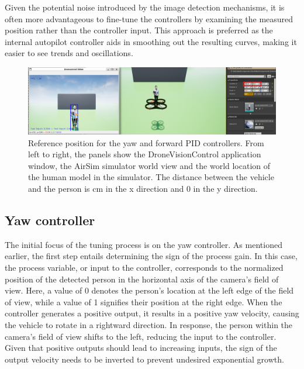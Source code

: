 Given the potential noise introduced by the image detection mechanisms, it is often more advantageous to fine-tune the controllers by examining the measured position rather than the controller input. This approach is preferred as the internal autopilot controller aids in smoothing out the resulting curves, making it easier to see trends and oscillations.



\begin{figure}[H]
  \centering
  \includegraphics[width=\textwidth, keepaspectratio]{img/pid-3/tune-ref-pos.png}
  \caption{Reference position for the yaw and forward PID controllers. From left to right, the panels show the DroneVisionControl application window, the AirSim simulator world view and the world location of the human model in the simulator. The distance between the vehicle and the person is \unit[420]{cm} in the x direction and 0 in the y direction.}
  \label{fig:tune-start-pos}
\end{figure}


\subsection{Yaw controller}

The initial focus of the tuning process is on the yaw controller. As mentioned earlier, the first step entails determining the sign of the process gain. In this case, the process variable, or input to the controller, corresponds to the normalized position of the detected person in the horizontal axis of the camera's field of view. Here, a value of 0 denotes the person's location at the left edge of the field of view, while a value of 1 signifies their position at the right edge. When the controller generates a positive output, it results in a positive yaw velocity, causing the vehicle to rotate in a rightward direction. In response, the person within the camera's field of view shifts to the left, reducing the input to the controller. Given that positive outputs should lead to increasing inputs, the sign of the output velocity needs to be inverted to prevent undesired exponential growth.

